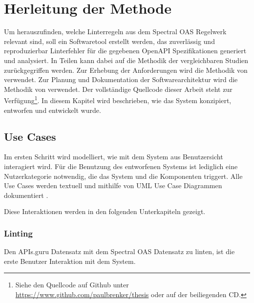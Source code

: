 \section{Herleitung der Methode} \label{sec:herleitungdermethode}
Um herauszufinden, welche Linterregeln aus dem Spectral \acs{OAS} Regelwerk relevant sind, soll ein Softwaretool erstellt werden, das zuverlässig und reproduzierbar Linterfehler für die gegebenen OpenAPI Spezifikationen generiert und analysiert. In Teilen kann dabei auf die Methodik der vergleichbaren Studien zurückgegriffen werden. Zur Erhebung der Anforderungen wird die Methodik von \parencite{bergsmann_requirements_2023} verwendet. Zur Planung und Dokumentation der Softwarearchitektur wird die Methodik von \parencite{starke_effektive_2024} verwendet. Der vollständige Quellcode dieser Arbeit steht zur Verfügung\footnote{Siehe den Quellcode auf Github unter \href{https://www.github.com/paulbrenker/thesis}{https://www.github.com/paulbrenker/thesis} oder auf der beiliegenden CD.}. In diesem Kapitel wird beschrieben, wie das System konzipiert, entworfen und entwickelt wurde.


\subsection{Use Cases} \label{sec:usecases}
Im ersten Schritt wird modelliert, wie mit dem System aus Benutzersicht interagiert wird. Für die Benutzung des entworfenen Systems ist lediglich eine Nutzerkategorie notwendig, die das System und die Komponenten triggert. Alle Use Cases werden textuell \parencite{bergsmann_requirements_2023} und mithilfe von \acf{UML} Use Case Diagrammen dokumentiert \parencite{rupp_uml_2012}.

Diese Interaktionen werden in den folgenden Unterkapiteln gezeigt.


\subsubsection{Linting} \label{linting}
Den APIs.guru Datensatz mit dem Spectral \acs{OAS} Datensatz zu linten, ist die erste Benutzer Interaktion mit dem System.

